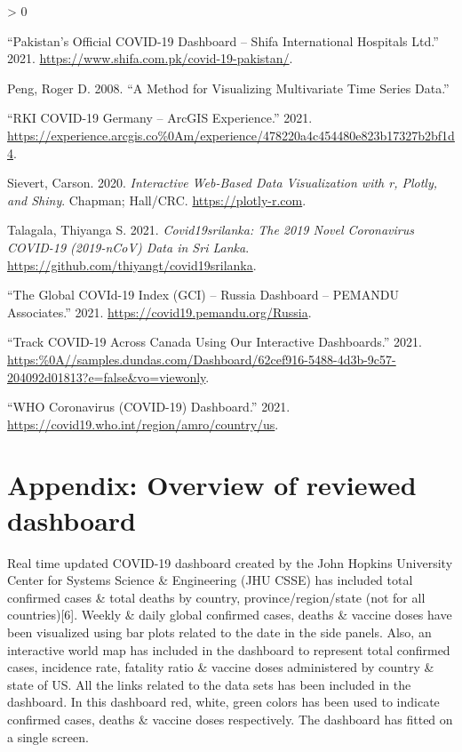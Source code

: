 \documentclass[
]{article}
\newlength{\cslhangindent}
\newenvironment{CSLReferences}[2] %
 {%
  \setlength{\parindent}{0pt}
  \ifodd #1 \everypar{\setlength{\hangindent}{\cslhangindent}}\ignorespaces\fi
  \ifnum #2 > 0
  \setlength{\parskip}{#2\baselineskip}
  \fi
 }%
 {}
\begin{document}
\begin{CSLReferences}{1}{0}
\leavevmode\hypertarget{ref-pakistan}{}%
{``{Pakistan's Official COVID-19 Dashboard -- Shifa International
Hospitals Ltd}.''} 2021.
\url{https://www.shifa.com.pk/covid-19-pakistan/}.

\leavevmode\hypertarget{ref-peng2008method}{}%
Peng, Roger D. 2008. {``A Method for Visualizing Multivariate Time
Series Data.''}

\leavevmode\hypertarget{ref-rki}{}%
{``{RKI COVID-19 Germany -- ArcGIS Experience}.''} 2021.
\url{https://experience.arcgis.co\%0Am/experience/478220a4c454480e823b17327b2bf1d4}.

\leavevmode\hypertarget{ref-plotly}{}%
Sievert, Carson. 2020. \emph{Interactive Web-Based Data Visualization
with r, Plotly, and Shiny}. Chapman; Hall/CRC.
\url{https://plotly-r.com}.

\leavevmode\hypertarget{ref-talagala}{}%
Talagala, Thiyanga S. 2021. \emph{Covid19srilanka: The 2019 Novel
Coronavirus COVID-19 (2019-nCoV) Data in Sri Lanka}.
\url{https://github.com/thiyangt/covid19srilanka}.

\leavevmode\hypertarget{ref-russia}{}%
{``{The Global COVId-19 Index (GCI) -- Russia Dashboard -- PEMANDU
Associates}.''} 2021. \url{https://covid19.pemandu.org/Russia}.

\leavevmode\hypertarget{ref-canada}{}%
{``{Track COVID-19 Across Canada Using Our Interactive Dashboards}.''}
2021.
\url{https:\%0A//samples.dundas.com/Dashboard/62cef916-5488-4d3b-9c57-204092d01813?e=false\&vo=viewonly}.

\leavevmode\hypertarget{ref-who}{}%
{``{WHO Coronavirus (COVID-19) Dashboard}.''} 2021.
\url{https://covid19.who.int/region/amro/country/us}.

\end{CSLReferences}

\newpage

\hypertarget{appendix-overview-of-reviewed-dashboard}{%
\section{Appendix: Overview of reviewed
dashboard}\label{appendix-overview-of-reviewed-dashboard}}

Real time updated COVID-19 dashboard created by the John Hopkins
University Center for Systems Science \& Engineering (JHU CSSE) has
included total confirmed cases \& total deaths by country,
province/region/state (not for all countries){[}6{]}. Weekly \& daily
global confirmed cases, deaths \& vaccine doses have been visualized
using bar plots related to the date in the side panels. Also, an
interactive world map has included in the dashboard to represent total
confirmed cases, incidence rate, fatality ratio \& vaccine doses
administered by country \& state of US. All the links related to the
data sets has been included in the dashboard. In this dashboard red,
white, green colors has been used to indicate confirmed cases, deaths \&
vaccine doses respectively. The dashboard has fitted on a single screen.
\end{document}
